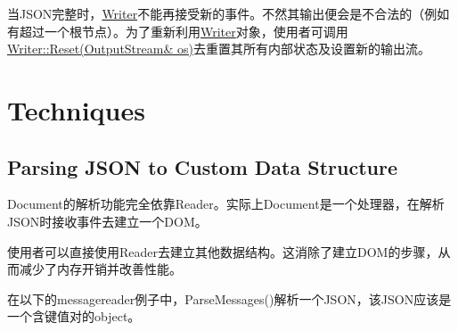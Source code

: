 当\+J\+S\+O\+N完整时，{\ttfamily \hyperlink{class_writer}{Writer}}不能再接受新的事件。不然其输出便会是不合法的（例如有超过一个根节点）。为了重新利用{\ttfamily \hyperlink{class_writer}{Writer}}对象，使用者可调用{\ttfamily \hyperlink{class_writer_a4e5bd5e6364edca476125b511b3dca9c}{Writer\+::\+Reset(\+Output\+Stream\& os)}}去重置其所有内部状态及设置新的输出流。\hypertarget{md_Commun_Externe_RapidJSON_doc_sax.zh-cn_Techniques}{}\section{Techniques}\label{md_Commun_Externe_RapidJSON_doc_sax.zh-cn_Techniques}
\hypertarget{md_Commun_Externe_RapidJSON_doc_sax.zh-cn_CustomDataStructure}{}\subsection{Parsing J\+S\+O\+N to Custom Data Structure}\label{md_Commun_Externe_RapidJSON_doc_sax.zh-cn_CustomDataStructure}
{\ttfamily Document}的解析功能完全依靠{\ttfamily Reader}。实际上{\ttfamily Document}是一个处理器，在解析\+J\+S\+O\+N时接收事件去建立一个\+D\+O\+M。

使用者可以直接使用{\ttfamily Reader}去建立其他数据结构。这消除了建立\+D\+O\+M的步骤，从而减少了内存开销并改善性能。

在以下的{\ttfamily messagereader}例子中，{\ttfamily Parse\+Messages()}解析一个\+J\+S\+O\+N，该\+J\+S\+O\+N应该是一个含键值对的object。


